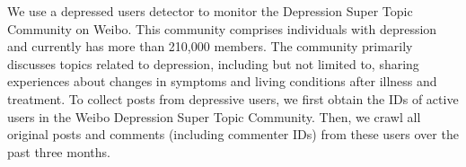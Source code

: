We use a depressed users detector to monitor the Depression Super Topic Community on Weibo. This community comprises individuals with depression and currently has more than 210,000 members. The community primarily discusses topics related to depression, including but not limited to, sharing experiences about changes in symptoms and living conditions after illness and treatment. To collect posts from depressive users, we first obtain the IDs of active users in the Weibo Depression Super Topic Community. Then, we crawl all original posts and comments (including commenter IDs) from these users over the past three months.


